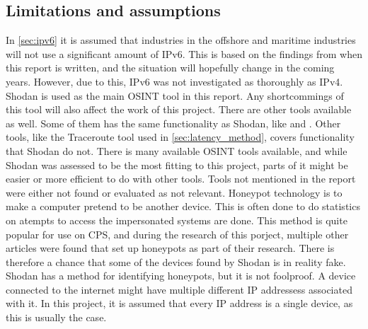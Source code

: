 \subsection{Limitations and assumptions} \label{sec:limits}
In \cref{sec:ipv6} it is assumed that industries in the offshore and maritime industries will not use a significant amount of IPv6. This is based on the findings from when this report is written, and the situation will hopefully change in the coming years. However, due to this, IPv6 was not investigated as thoroughly as IPv4.
Shodan is used as the main OSINT tool in this report. Any shortcommings of this tool will also affect the work of this project.
There are other tools available as well. Some of them has the same functionality as Shodan, like \href{https://censys.io/}{\color{blue}{Censys}}\cite{censys} and \href{www.zoomeye.org}{\color{blue}{ZoomEye}}\cite{zoomeye}. Other tools, like the Traceroute tool used in \cref{sec:latency_method}, covers functionality that Shodan do not. There is many available OSINT tools available, and while Shodan was assessed to be the most fitting to this project, parts of it might be easier or more efficient to do with other tools. Tools not mentioned in the report were either not found or evaluated as not relevant.
Honeypot technology is to make a computer pretend to be another device. This is often done to do statistics on atempts to access the impersonated systems are done. This method is quite popular for use on CPS, and during the research of this porject, multiple other articles were found that set up honeypots as part of their research.\cite{bodenheim_butts_dunlap_mullins_2014}\cite{ICS_shodan_article} There is therefore a chance that some of the devices found by Shodan is in reality fake. Shodan has a method for identifying honeypots, but it is not foolproof.
A device connected to the internet might have multiple different IP addressess associated with it. In this project, it is assumed that every IP address is a single device, as this is usually the case.


